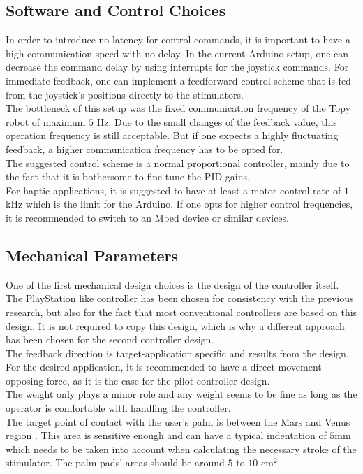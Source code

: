 \subsection{Software and Control Choices}
In order to introduce no latency for control commands, it is important to have a high communication speed with no delay. In the current Arduino setup, one can decrease the command delay by using interrupts for the joystick commands. For immediate feedback, one can implement a feedforward control scheme that is fed from the joystick's positions directly to the stimulators.\\
The bottleneck of this setup was the fixed communication frequency of the Topy robot of maximum $5$ Hz. Due to the small changes of the feedback value, this operation frequency is still acceptable. But if one expects a highly fluctuating feedback, a higher communication frequency has to be opted for.\\
The suggested control scheme is a normal proportional controller, mainly due to the fact that it is bothersome to fine-tune the PID gains.\\
For haptic applications, it is suggested to have at least a motor control rate of $1$kHz which is the limit for the Arduino. If one opts for higher control frequencies, it is recommended to switch to an Mbed device or similar devices.

\subsection{Mechanical Parameters}
One of the first mechanical design choices is the design of the controller itself. The PlayStation like controller has been chosen for consistency with the previous research, but also for the fact that most conventional controllers are based on this design. It is not required to copy this design, which is why a different approach has been chosen for the second controller design.\\
The feedback direction is target-application specific and results from the design. For the desired application, it is recommended to have a direct movement opposing force, as it is the case for the pilot controller design.\\
The weight only plays a minor role and any weight seems to be fine as long as the operator is comfortable with handling the controller.\\

The target point of contact with the user's palm is between the Mars and Venus region %
. This area is sensitive enough and can have a typical indentation of $5$mm which needs to be taken into account when calculating the necessary stroke of the stimulator. The palm pads' areas should be around $5$ to $10$ cm$^2$.\\

